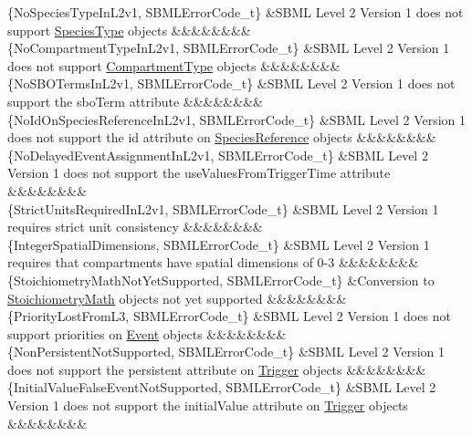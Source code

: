 \begin{DoxyParagraph}{}
\begin{longtabu}
\{No\+Species\+Type\+In\+L2v1, S\+B\+M\+L\+Error\+Code\+\_\+t\} &S\+B\+ML Level 2 Version 1 does not support \hyperlink{class_species_type}{Species\+Type} objects &&&&&&&&\\
\{No\+Compartment\+Type\+In\+L2v1, S\+B\+M\+L\+Error\+Code\+\_\+t\} &S\+B\+ML Level 2 Version 1 does not support \hyperlink{class_compartment_type}{Compartment\+Type} objects &&&&&&&&\\
\{No\+S\+B\+O\+Terms\+In\+L2v1, S\+B\+M\+L\+Error\+Code\+\_\+t\} &S\+B\+ML Level 2 Version 1 does not support the \textquotesingle{}sbo\+Term\textquotesingle{} attribute &&&&&&&&\\
\{No\+Id\+On\+Species\+Reference\+In\+L2v1, S\+B\+M\+L\+Error\+Code\+\_\+t\} &S\+B\+ML Level 2 Version 1 does not support the \textquotesingle{}id\textquotesingle{} attribute on \hyperlink{class_species_reference}{Species\+Reference} objects &&&&&&&&\\
\{No\+Delayed\+Event\+Assignment\+In\+L2v1, S\+B\+M\+L\+Error\+Code\+\_\+t\} &S\+B\+ML Level 2 Version 1 does not support the \textquotesingle{}use\+Values\+From\+Trigger\+Time\textquotesingle{} attribute &&&&&&&&\\
\{Strict\+Units\+Required\+In\+L2v1, S\+B\+M\+L\+Error\+Code\+\_\+t\} &S\+B\+ML Level 2 Version 1 requires strict unit consistency &&&&&&&&\\
\{Integer\+Spatial\+Dimensions, S\+B\+M\+L\+Error\+Code\+\_\+t\} &S\+B\+ML Level 2 Version 1 requires that compartments have spatial dimensions of 0-\/3 &&&&&&&&\\
\{Stoichiometry\+Math\+Not\+Yet\+Supported, S\+B\+M\+L\+Error\+Code\+\_\+t\} &Conversion to \hyperlink{class_stoichiometry_math}{Stoichiometry\+Math} objects not yet supported &&&&&&&&\\
\{Priority\+Lost\+From\+L3, S\+B\+M\+L\+Error\+Code\+\_\+t\} &S\+B\+ML Level 2 Version 1 does not support priorities on \hyperlink{class_event}{Event} objects &&&&&&&&\\
\{Non\+Persistent\+Not\+Supported, S\+B\+M\+L\+Error\+Code\+\_\+t\} &S\+B\+ML Level 2 Version 1 does not support the \textquotesingle{}persistent\textquotesingle{} attribute on \hyperlink{class_trigger}{Trigger} objects &&&&&&&&\\
\{Initial\+Value\+False\+Event\+Not\+Supported, S\+B\+M\+L\+Error\+Code\+\_\+t\} &S\+B\+ML Level 2 Version 1 does not support the \textquotesingle{}initial\+Value\textquotesingle{} attribute on \hyperlink{class_trigger}{Trigger} objects &&&&&&&&\\

\end{longtabu}
\end{DoxyParagraph}
